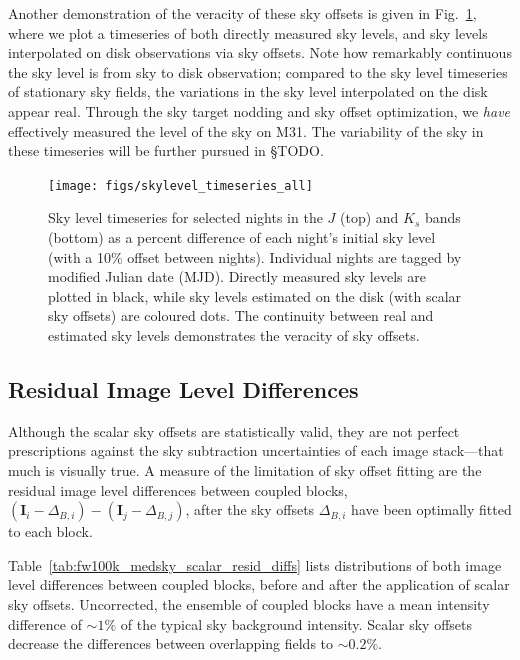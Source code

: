 \documentclass[iop]{emulateapj}
\newcommand{\vect}[1]{\boldsymbol{#1}} %
\newcommand{\todo}[1]{\textcolor{BurntOrange}{\textsf{#1}}} %
\newcommand{\Fig}[1]{Fig.~\ref{fig:#1}}  %
\newcommand{\Tab}[1]{Table~\ref{tab:#1}}  %
\begin{document}
Another demonstration of the veracity of these sky offsets is given in \Fig{skylevel_timeseries}, where we plot a timeseries of both directly measured sky levels, and sky levels interpolated on disk observations via sky offsets.
Note how remarkably continuous the sky level is from sky to disk observation; compared to the sky level timeseries of stationary sky fields, the variations in the sky level interpolated on the disk appear real.
Through the sky target nodding and sky offset optimization, we \emph{have} effectively measured the level of the sky on M31.
The variability of the sky in these timeseries will be further pursued in \S \todo{TODO}.

\begin{figure}[t]
\centering
\texttt{[image: figs/skylevel\_timeseries\_all]}
\caption{Sky level timeseries for selected nights in the $J$ (top) and $K_s$ bands (bottom) as a percent difference of each night's initial sky level (with a 10\% offset between nights).
Individual nights are tagged by modified Julian date (MJD).
Directly measured sky levels are plotted in black, while sky levels estimated on the disk (with scalar sky offsets) are coloured dots. The continuity between real and estimated sky levels demonstrates the veracity of sky offsets.}
\label{fig:skylevel_timeseries}
\end{figure}

\subsection{Residual Image Level Differences}
\label{sec:residual_diffs}

Although the scalar sky offsets are statistically valid, they are not perfect prescriptions against the sky subtraction uncertainties of each image stack---that much is visually true.
A measure of the limitation of sky offset fitting are the residual image level differences between coupled blocks, $(\vect{I}_i - \Delta_{B,i}) - (\vect{I}_j - \Delta_{B,j})$, after the sky offsets $\Delta_{B,i}$ have been optimally fitted to each block.

\Tab{fw100k_medsky_scalar_resid_diffs} lists distributions of both image level differences between coupled blocks, before and after the application of scalar sky offsets.
Uncorrected, the ensemble of coupled blocks have a mean intensity difference of $\sim 1\%$ of the typical sky background intensity.
Scalar sky offsets decrease the differences between overlapping fields to $\sim 0.2\%$.
\end{document}
